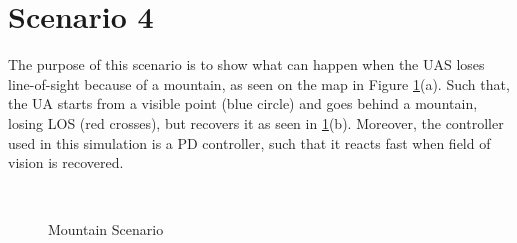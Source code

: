 \section{Scenario 4}\label{sec:scenario4}
The purpose of this scenario is to show what can happen when the UAS loses line-of-sight because of a mountain, as seen on the map in Figure \ref{fig:s4_map}(a). Such that, the UA starts from a visible point (blue circle) and goes behind a mountain, losing LOS (red crosses), but recovers it as seen in \ref{fig:s4_map}(b). Moreover, the controller used in this simulation is a PD controller, such that it reacts fast when field of vision is recovered.

\begin{figure}[H]
	\hfill
	\hfill
	\\
	\hfill
	\hfill
	\caption{Mountain Scenario}
	\label{fig:s4_map}
\end{figure}

